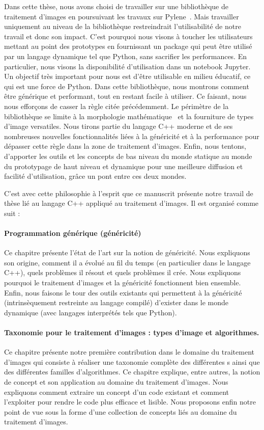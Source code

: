 Dans cette thèse, nous avons choisi de travailler sur une bibliothèque de traitement d'images en poursuivant les travaux
sur Pylene~\parencite{carlinet.2018.pylena}. Mais travailler uniquement au niveau de la bibliothèque restreindrait
l'utilisabilité de notre travail et donc son impact. C'est pourquoi nous visons à toucher les utilisateurs mettant au
point des prototypes en fournissant un package qui peut être utilisé par un langage dynamique tel que Python, sans
sacrifier les performances. En particulier, nous visons la disponibilité d'utilisation dans un notebook Jupyter. Un
objectif très important pour nous est d'être utilisable en milieu éducatif, ce qui est une force de Python. Dans cette
bibliothèque, nous montrons comment être générique et performant, tout en restant facile à utiliser. Ce faisant, nous
nous efforçons de casser la règle citée précédemment. Le périmètre de la bibliothèque se limite à la morphologie
mathématique~\parencite{najman.2013.mathematical,geraud.2010.book} et la fourniture de types d'image versatiles. Nous
tirons partie du langage C++ moderne et de ses nombreuses nouvelles fonctionnalités liées à la généricité et à la
performance pour dépasser cette règle dans la zone de traitement d'images. Enfin, nous tentons, d'apporter les outils et
les concepts de bas niveau du monde statique au monde du prototypage de haut niveau et dynamique pour une meilleure
diffusion et facilité d'utilisation, grâce un pont entre ces deux mondes.

C'est avec cette philosophie à l'esprit que ce manuscrit présente notre travail de thèse lié au langage C++ appliqué au
traitement d'images. Il est organisé comme suit :

\paragraph{Programmation générique (généricité)} Ce chapitre présente l'état de l'art sur la notion de généricité. Nous
expliquons son origine, comment il a évolué au fil du temps (en particulier dans le langage C++), quels problèmes il
résout et quels problèmes il crée. Nous expliquons pourquoi le traitement d'images et la généricité fonctionnent bien
ensemble. Enfin, nous faisons le tour des outils existants qui permettent à la généricité (intrinsèquement restreinte au
langage compilé) d'exister dans le monde dynamique (avec langages interprétés tels que Python).

\paragraph{Taxonomie pour le traitement d'images : types d'image et algorithmes.} Ce chapitre présente notre première
contribution dans le domaine du traitement d'images qui consiste à réaliser une taxonomie complète des différentes
s ainsi que des différentes familles d'algorithmes. Ce chapitre explique, entre autres, la notion de
concept et son application au domaine du traitement d'images. Nous expliquons comment extraire un concept d'un code
existant et comment l'exploiter pour rendre le code plus efficace et lisible. Nous proposons enfin notre point de vue
sous la forme d'une collection de concepts liés au domaine du traitement d'images.

